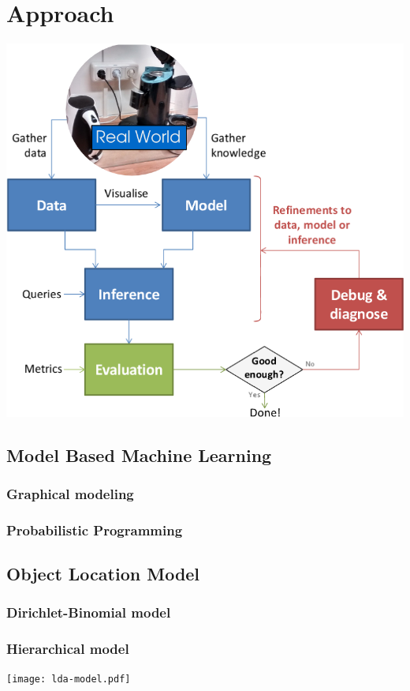 \documentclass{llncs}
\begin{document}
%
\section{Approach}
\includegraphics[width=\textwidth]{Lifecycle.png}
\subsection{Model Based Machine Learning}
\subsubsection{Graphical modeling}
\subsubsection{Probabilistic Programming}

\subsection{Object Location Model}
\subsubsection{Dirichlet-Binomial model}
\subsubsection{Hierarchical model}
\texttt{[image: lda-model.pdf]}
\end{document}

